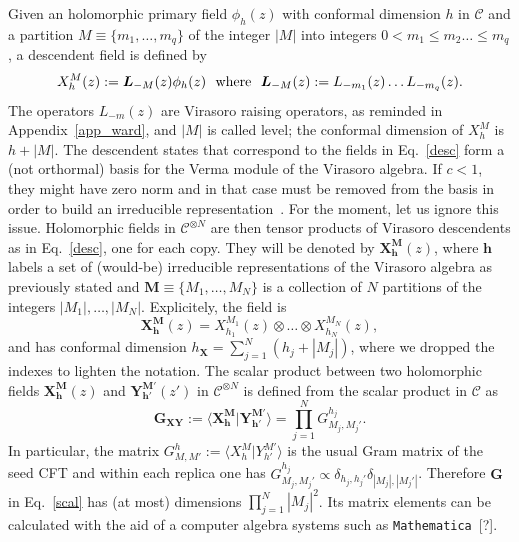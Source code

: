 \documentclass[a4paper,11pt]{article}
\begin{document}
 Given an holomorphic primary field $\phi_{h}(z)$ with conformal dimension $h$ in $\mathcal{C}$ and a partition $M\equiv\{m_1,\dots,m_q\}$ of the integer $|M|$ into integers $0<m_1\leq m_2\dots\leq m_q$, a descendent field is defined by~\cite{BPZ}
\begin{equation}
\label{desc}
 X_{h}^{M}(z):=\boldsymbol{L}_{-M}(z)\phi_h(z)~~{\rm{where}}~~ \boldsymbol{L}_{-M}(z):=L_{-m_1}(z)\dots L_{-m_q}(z).
 \end{equation}
The operators $L_{-m}(z)$ are Virasoro raising operators, as reminded in Appendix~\ref{app_ward}, and $|M|$ is called level; the conformal dimension of $X_{h}^{M}$ is $h+|M|$. The descendent states that correspond to the fields in Eq.~\eqref{desc} form a (not orthormal) basis for the Verma module of the Virasoro algebra. If $c<1$, they might have zero norm and in that case must be removed from the basis in order to build an irreducible representation~\cite{BPZ, Friedan, Ribault}. For the moment, let us ignore this issue.
 Holomorphic fields in $\mathcal{C}^{\otimes N}$ are then tensor products of Virasoro descendents as in Eq.~\eqref{desc}, one for each copy. They will be denoted by
 $\boldsymbol{X}^{\boldsymbol{M}}_{\boldsymbol{h}}(z)$, where $\boldsymbol{h}$ labels a set of (would-be) irreducible representations
of the Virasoro algebra as previously stated and $\boldsymbol{M}\equiv\{M_1,\dots,M_N\}$ is a collection of $N$ partitions of the  integers $|M_1|,\dots, |M_N|$. Explicitely, the field is 
\begin{equation}
 \boldsymbol{X}_{\boldsymbol{h}}^{\boldsymbol{M}}(z)=X_{h_1}^{M_1}(z)\otimes \dots \otimes X_{h_N}^{M_N}(z),
\end{equation}
and has conformal dimension  $h_{\boldsymbol{\boldsymbol{X}}}=\sum_{j=1}^N(h_j+|M_j|)$, where we  dropped the indexes to lighten the notation. The scalar product between two holomorphic fields $\boldsymbol{X}_{\boldsymbol{h}}^{\boldsymbol{M}}(z)$ and $\boldsymbol{Y}_{\boldsymbol{h}'}^{\boldsymbol{M}'}(z')$ in $\mathcal{C}^{\otimes N}$ is defined from the scalar product in $\mathcal{C}$ as
\begin{equation}
\label{scal}
 \boldsymbol{G}_{\boldsymbol{X}\boldsymbol{Y}}:=\langle \boldsymbol{X}_{\boldsymbol{h}}^{\boldsymbol{M}} | \boldsymbol{Y}_{\boldsymbol{h}'}^{\boldsymbol{M}'}\rangle=\prod_{j=1}^N G^{h_j}_{M_j,M_j'}.
\end{equation}
In particular, the matrix $G^{h}_{M,M'}:=\langle X_{h}^{M}|Y_{h'}^{M'}\rangle$ is the usual Gram matrix of the seed CFT and within each replica  one has $G^{h_j}_{M_j,M_j'}\propto\delta_{h_j,h_j'}\delta_{|M_j|,|M_j'|}$. Therefore $\boldsymbol{G}$ in Eq.~\eqref{scal} has (at most) dimensions  $\prod_{j=1}^{N}|M_j|^2$. Its  matrix elements can be calculated with the aid of a computer algebra systems such as \texttt{Mathematica}~{\color{red}[?]}.
\end{document}
